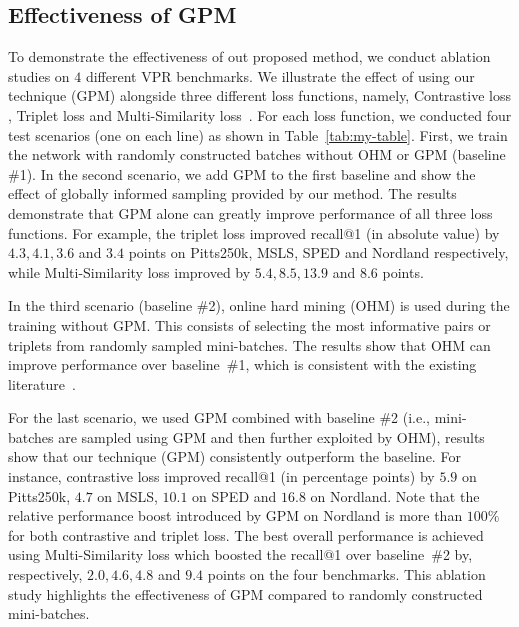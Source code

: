\documentclass{bmvc2k}
\begin{document}
\subsection{Effectiveness of GPM}
To demonstrate the effectiveness of out proposed method, we conduct ablation studies on $4$ different VPR benchmarks. We illustrate the effect of using our technique (GPM) alongside three different loss functions, namely, Contrastive loss \cite{hadsell2006dimensionality}, Triplet loss \cite{hermans2017defense} and Multi-Similarity loss~\cite{wang2019multi}. For each loss function, we conducted four  test scenarios (one on each line) as shown in Table~\ref{tab:my-table}. First, we train the network with randomly constructed batches without OHM or GPM (baseline \#1). In the second scenario, we add GPM to the first baseline and show the effect of globally informed sampling provided by our method. The results demonstrate that GPM alone can greatly improve performance of all three loss functions. For example, the triplet loss improved recall@1 (in absolute value) by $4.3, 4.1, 3.6$ and $3.4$ points on Pitts250k, MSLS, SPED and Nordland respectively, while Multi-Similarity loss improved by $5.4, 8.5, 13.9$ and $8.6$ points.  

In the third scenario (baseline \#2), online hard mining (OHM) is used during the training without GPM. This consists of selecting the most informative pairs or triplets from randomly sampled mini-batches. The results show that OHM can improve performance over baseline~\#1, which is consistent with the existing literature~\cite{hermans2017defense}. 

For the last scenario, we used GPM combined with baseline \#2 (i.e., mini-batches are sampled using GPM and then further exploited by OHM), results show that our technique (GPM) consistently outperform the baseline. For instance, contrastive loss improved recall@1 (in percentage points) by $5.9$ on Pitts250k, $4.7$ on MSLS, $10.1$ on SPED and $16.8$ on Nordland. Note that the relative performance boost introduced by GPM on Nordland is more than $100\%$ for both contrastive and triplet loss. The best overall performance is achieved using Multi-Similarity loss which boosted the recall@1 over baseline~\#2 by, respectively, $2.0, 4.6, 4.8$ and $9.4$ points on the four benchmarks. This ablation study highlights the effectiveness of GPM compared to randomly constructed mini-batches.
\end{document}
